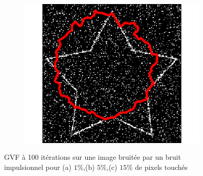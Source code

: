 \begin{figure}[H]
\begin{subfigure}[c]{0.3\linewidth}
\includegraphics[width=\textwidth]{Chapters/Images/Noise/gvfimp15}
\caption{}
\end{subfigure}
\caption{GVF à 100 itérations sur une image bruitée par un bruit impulsionnel pour (a) $1\%$,(b) $5\%$,(c) $15\%$ de pixels touchés}
\end{figure}

